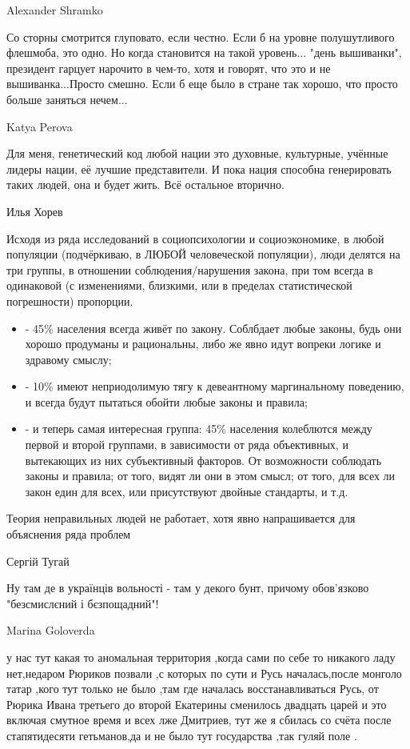 Alexander Shramko

Со сторны смотрится глуповато, если честно. Если б на уровне полушутливого
флешмоба, это одно. Но когда становится на такой уровень... "день вышиванки",
президент гарцует нарочито в чем-то, хотя и говорят, что это и не
вышиванка...Просто смешно. Если б еще было в стране так хорошо, что просто
больше заняться нечем...

Katya Perova

Для меня, генетический код любой нации это духовные, культурные, учённые лидеры
нации, её лучшие представители. И пока нация способна генерировать таких людей,
она и будет жить. Всё остальное вторично.

Илья Хорев

Исходя из ряда исследований в социопсихологии и социоэкономике, в любой
популяции (подчёркиваю, в ЛЮБОЙ человеческой популяции), люди делятся на три
группы, в отношении соблюдения/нарушения закона, при том всегда в одинаковой (с
изменениями, близкими, или в пределах статистической погрешности) пропорции.

\begin{itemize}
\item - 45\% населения всегда живёт по закону. Соблбдает любые законы, будь они
				хорошо продуманы и рациональны, либо же явно идут вопреки логике и
								здравому смыслу;

\item - 10\% имеют неприодолимую тягу к девеантному маргинальному поведению, и
				всегда будут пытаться обойти любые законы и правила;

\item - и теперь самая интересная группа: 45\% населения колеблются между
				первой и второй группами, в зависимости от ряда объективных, и
								вытекающих из них субъективный факторов. От возможности
								соблюдать законы и правила; от того, видят ли они в этом смысл;
								от того, для всех ли закон един для всех, или присутствуют
								двойные стандарты, и т.д.
\end{itemize}

Теория неправильных людей не работает, хотя явно напрашивается для объяснения ряда проблем

Сергій Тугай

Ну там де в українців вольності - там у декого бунт, причому обов'язково
"безсмислєний і бєзпощадний"!

Marina Goloverda

у нас тут какая то аномальная территория ,когда сами по себе то никакого ладу
нет,недаром Рюриков позвали ,с которых по сути и Русь началась,после монголо
татар ,кого тут только не было ,там где началась восстанавливаться Русь, от
Рюрика Ивана третьего до второй Екатерины сменилось двадцать царей и это
включая смутное время и всех лже Дмитриев, тут же я сбилась со счёта после
стапятидесяти гетьманов,да и не было тут государства ,так гуляй поле .

